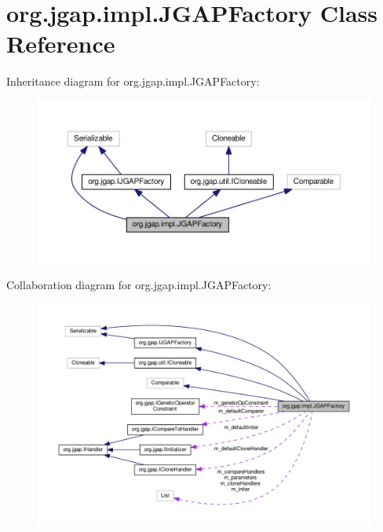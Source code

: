 \hypertarget{classorg_1_1jgap_1_1impl_1_1_j_g_a_p_factory}{\section{org.\-jgap.\-impl.\-J\-G\-A\-P\-Factory Class Reference}
\label{classorg_1_1jgap_1_1impl_1_1_j_g_a_p_factory}
}


Inheritance diagram for org.\-jgap.\-impl.\-J\-G\-A\-P\-Factory\-:
\nopagebreak
\begin{figure}[H]
\begin{center}
\leavevmode
\includegraphics[width=350pt]{classorg_1_1jgap_1_1impl_1_1_j_g_a_p_factory__inherit__graph}
\end{center}
\end{figure}


Collaboration diagram for org.\-jgap.\-impl.\-J\-G\-A\-P\-Factory\-:
\nopagebreak
\begin{figure}[H]
\begin{center}
\leavevmode
\includegraphics[width=350pt]{classorg_1_1jgap_1_1impl_1_1_j_g_a_p_factory__coll__graph}
\end{center}
\end{figure}
